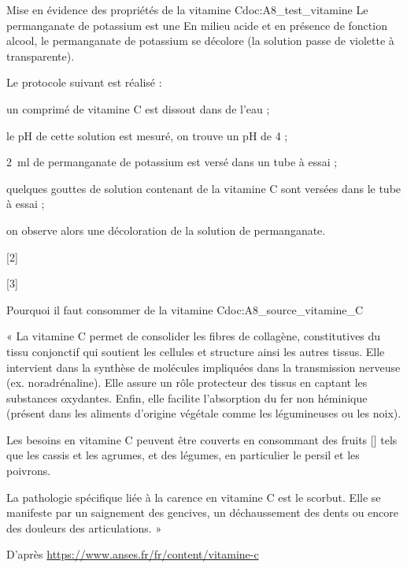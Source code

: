 \begin{doc}{Mise en évidence des propriétés de la vitamine C}{doc:A8_test_vitamine}
  Le permanganate de potassium est une 
  En milieu acide et en présence de fonction alcool, le permanganate de potassium se décolore (la solution passe de violette à transparente).

  Le protocole suivant est réalisé :
  \begin{protocole}
    \item un comprimé de vitamine C est dissout dans de l'eau ;
    \item le pH de cette solution est mesuré, on trouve un pH de 4 ;
    \item \qty{2}{\ml} de permanganate de potassium est versé dans un tube à essai ;
    \item quelques gouttes de solution contenant de la vitamine C sont versées dans le tube à essai ;
    \item on observe alors une décoloration de la solution de permanganate.
  \end{protocole}
\end{doc}

[2]

[3]


\begin{doc}{Pourquoi il faut consommer de la vitamine C}{doc:A8_source_vitamine_C}
  
  « La vitamine C permet de consolider les fibres de collagène, constitutives du tissu conjonctif qui soutient les cellules et structure ainsi les autres tissus.
  Elle intervient dans la synthèse de molécules impliquées dans la transmission nerveuse (ex. noradrénaline).
  Elle assure un rôle protecteur des tissus en captant les substances oxydantes.
  Enfin, elle facilite l’absorption du fer non héminique (présent dans les aliments d’origine végétale comme les légumineuses ou les noix). 
  \medskip
  
  Les besoins en vitamine C peuvent être couverts en consommant des fruits [] tels que les cassis et les agrumes, et des légumes, en particulier le persil et les poivrons.
  \medskip

  La pathologie spécifique liée à la carence en vitamine C est le scorbut.
  Elle se manifeste par un saignement des gencives, un déchaussement des dents ou encore des douleurs des articulations. »

  \begin{flushright}
    D'après \url{https://www.anses.fr/fr/content/vitamine-c}
  \end{flushright}
\end{doc}

